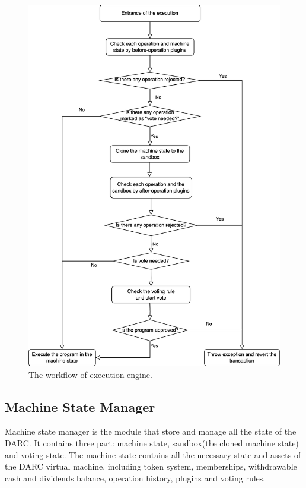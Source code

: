 \documentclass[main.tex]{subfiles}
\begin{document}
\begin{figure}
\centering
\includegraphics[width=1\linewidth]{execution_flow.drawio.png}
\caption{\label{fig:workflow}The workflow of execution engine.}
\end{figure}

\subsection{Machine State Manager}

Machine state manager is the module that store and manage all the state of the DARC. It contains three part: machine state, sandbox(the cloned machine state) and voting state. The machine state contains all the necessary state and assets of the DARC virtual machine, including token system, memberships, withdrawable cash and dividends balance, operation history, plugins and voting rules. 
\end{document}
